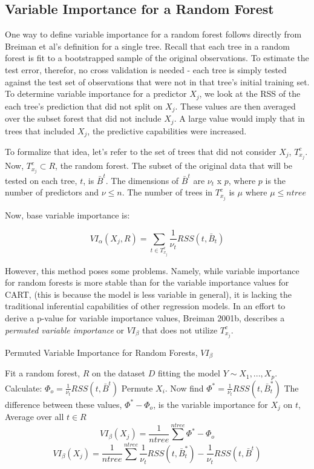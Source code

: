 \documentclass[12pt,twoside]{reedthesis}
\begin{document}
  \subsection{Variable Importance for a Random
  Forest}\label{variable-importance-for-a-random-forest}
  
  One way to define variable importance for a random forest follows
  directly from Breiman et al's definition for a single tree. Recall that
  each tree in a random forest is fit to a bootstrapped sample of the
  original observations. To estimate the test error, therefor, no cross
  validation is needed - each tree is simply tested against the test set
  of observations that were not in that tree's initial training set. To
  determine variable importance for a predictor \(X_j\), we look at the
  RSS of the each tree's prediction that did not split on \(X_j\). These
  values are then averaged over the subset forest that did not include
  \(X_j\). A large value would imply that in trees that included \(X_j\),
  the predictive capabilities were increased.
  
  To formalize that idea, let's refer to the set of trees that did not
  consider \(X_j\), \(T_{x_j}^c\). Now, \(T_{x_j}^c \subset R\), the
  random forest. The subset of the original data that will be tested on
  each tree, \(t\), is \(\bar{B}^t\). The dimensions of \(\bar{B}^t\) are
  \(\nu_t\) x \(p\), where \(p\) is the number of predictors and
  \(\nu \leq n\). The number of trees in \(T_{x_j}^c\) is \(\mu\) where
  \(\mu \leq ntree\)
  
  Now, base variable importance is:
  
  \[VI_{\alpha}(X_j, R) =  \sum_{t \in T_{x_j}^c} \frac 1 {\nu_t} RSS(t,\bar{B}_t)\]
  
  However, this method poses some problems. Namely, while variable
  importance for random forests is more stable than for the variable
  importance values for CART, (this is because the model is less variable
  in general), it is lacking the traditional inferential capabilities of
  other regression models. In an effort to derive a p-value for variable
  importance values, Breiman 2001b, describes a \emph{permuted variable
  importance} or \(VI_{\beta}\) that does not utilize \(T_{x_j}^c\).
  
  \begin{algorithm}
  \caption{Permuted Variable Importance for Random Forests, $VI_{\beta}$}
  \label{breiman}
  \begin{algorithmic}
  \State Fit a random forest, $R$ on the dataset $D$ fitting the model $Y \sim X_1,...,X_p$.
  \State Calculate: $\Phi_o =  \frac 1 {\nu_t} RSS(t,\bar{B}^t)$
  \State Permute $X_i$. Now find $\Phi^* =  \frac 1 {\nu_t} RSS(t,\bar{B}_t^*)$
  \State The difference between these values, $\Phi^* - \Phi_o$,  is the variable importance for $X_j$ on $t$,  
  \EndFor
  \State Average over all $t \in R$ 
   $$VI_{\beta}(X_j) = \frac 1 {ntree} \sum^{ntree} \Phi^* - \Phi_o$$
   $$VI_{\beta}(X_j) = \frac 1 {ntree} \sum^{ntree} \frac 1 {\nu_t} RSS(t,\bar{B}_t^*) - \frac 1 {\nu_t} RSS(t,\bar{B}^t)$$
  \EndFor
  \end{algorithmic}
  \end{algorithm}
  
\end{document}

